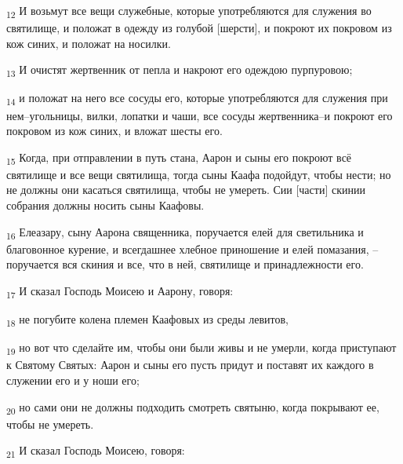 \begin{tcolorbox}
\textsubscript{12} И возьмут все вещи служебные, которые употребляются для служения во святилище, и положат в одежду из голубой [шерсти], и покроют их покровом из кож синих, и положат на носилки.
\end{tcolorbox}
\begin{tcolorbox}
\textsubscript{13} И очистят жертвенник от пепла и накроют его одеждою пурпуровою;
\end{tcolorbox}
\begin{tcolorbox}
\textsubscript{14} и положат на него все сосуды его, которые употребляются для служения при нем--угольницы, вилки, лопатки и чаши, все сосуды жертвенника--и покроют его покровом из кож синих, и вложат шесты его.
\end{tcolorbox}
\begin{tcolorbox}
\textsubscript{15} Когда, при отправлении в путь стана, Аарон и сыны его покроют всё святилище и все вещи святилища, тогда сыны Каафа подойдут, чтобы нести; но не должны они касаться святилища, чтобы не умереть. Сии [части] скинии собрания должны носить сыны Каафовы.
\end{tcolorbox}
\begin{tcolorbox}
\textsubscript{16} Елеазару, сыну Аарона священника, поручается елей для светильника и благовонное курение, и всегдашнее хлебное приношение и елей помазания, --поручается вся скиния и все, что в ней, святилище и принадлежности его.
\end{tcolorbox}
\begin{tcolorbox}
\textsubscript{17} И сказал Господь Моисею и Аарону, говоря:
\end{tcolorbox}
\begin{tcolorbox}
\textsubscript{18} не погубите колена племен Каафовых из среды левитов,
\end{tcolorbox}
\begin{tcolorbox}
\textsubscript{19} но вот что сделайте им, чтобы они были живы и не умерли, когда приступают к Святому Святых: Аарон и сыны его пусть придут и поставят их каждого в служении его и у ноши его;
\end{tcolorbox}
\begin{tcolorbox}
\textsubscript{20} но сами они не должны подходить смотреть святыню, когда покрывают ее, чтобы не умереть.
\end{tcolorbox}
\begin{tcolorbox}
\textsubscript{21} И сказал Господь Моисею, говоря:
\end{tcolorbox}
